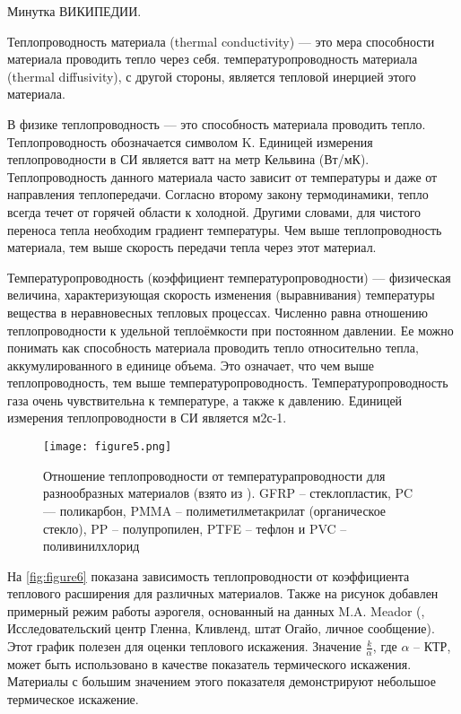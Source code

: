 \begin{adjustwidth}{3.5em}{3.5em}
{\color{blue} Минутка ВИКИПЕДИИ.

Теплопроводность материала (thermal conductivity) --- это мера способности материала проводить тепло через себя. температуропроводность материала (thermal diffusivity), с другой стороны, является тепловой инерцией этого материала.


В физике теплопроводность --- это способность материала проводить тепло. Теплопроводность обозначается символом K. Единицей измерения теплопроводности в СИ является ватт на метр Кельвина (Вт/мК). Теплопроводность данного материала часто зависит от температуры и даже от направления теплопередачи. Согласно второму закону термодинамики, тепло всегда течет от горячей области к холодной. Другими словами, для чистого переноса тепла необходим градиент температуры. Чем выше теплопроводность материала, тем выше скорость передачи тепла через этот материал. 


Температуропроводность (коэффициент тем\-пе\-ра\-ту\-ро\-про\-вод\-нос\-ти) --- физическая величина, характеризующая скорость изменения (выравнивания) температуры вещества в неравновесных тепловых процессах. Численно равна отношению теплопроводности к удельной теплоёмкости при постоянном давлении.  Ее можно понимать как способность материала проводить тепло относительно тепла, аккумулированного в единице объема. Это означает, что чем выше теплопроводность, тем выше температуропроводность.  Температуропроводность газа очень чувствительна к температуре, а также к давлению. Единицей измерения теплопроводности в СИ является м2с-1.
}
\end{adjustwidth}

\begin{figure}[h!]
\centering
\texttt{[image: figure5.png]}%
\caption{Отношение теплопроводности от температурапроводности для разнообразных материалов  (взято из \cite{ashby2005}). GFRP -- стеклопластик, PC--- поликарбон, PMMA -- полиметилметакрилат (органическое стекло), PP -- полупропилен, PTFE -- тефлон и PVC -- поливинилхлорид}
\label{fig:figure5}
\end{figure}

На \cref{fig:figure6} показана зависимость теплопроводности от коэффициента теплового расширения для различных материалов. Также на рисунок добавлен примерный режим работы аэрогеля, основанный на данных M.A. Meador (\cite{meador2005}, Исследовательский центр Гленна, Кливленд, штат Огайо, личное сообщение). Этот график полезен для оценки теплового искажения. Значение \(\frac{k}{\alpha}\), где \(\alpha\) -- КТР, может быть использовано в качестве показатель термического искажения. Материалы с большим значением этого показателя демонстрируют небольшое термическое искажение.


